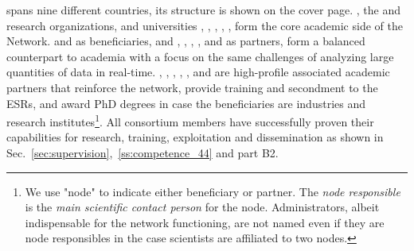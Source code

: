 \acronym spans nine different countries, its structure is shown on the cover page.
\cernentity, the \nikhefentity and \cnrsentity research organizations, and universities \sorbonneentity, \helsinkientity, \unigeentity, \dortmundentity, \lundentity, \heidelbergentity form the core academic side of the Network.
\ibmentity and \dqentity as beneficiaries, and \ximantisentity, \lightboxentity, \fleetmaticsentity, \cathientity, \wildtreeentity and \heidelberginstrumentsentity as partners, form a balanced counterpart to academia with a focus on the same challenges of analyzing large quantities of data in real-time. 
\oregonentity, \ohioentity, \cincinnatientity, \pisaentity, \santiagoentity, \radboudentity and \amsterdamentity are high-profile associated academic partners that reinforce the
network, provide training and secondment to the ESRs, and award PhD degrees in case the beneficiaries are industries and research institutes\footnote{We use "node" to indicate
either beneficiary or partner. The \textit{node responsible} is the \textit{main scientific contact person} for the node. Administrators, albeit indispensable for the network functioning, are not named even if they are node responsibles in the case scientists are affiliated to two nodes.}.
All consortium members  have successfully proven their capabilities for research, training, exploitation and dissemination as shown in Sec.~\ref{sec:supervision},~\ref{ss:competence_44} and part B2.    
    


